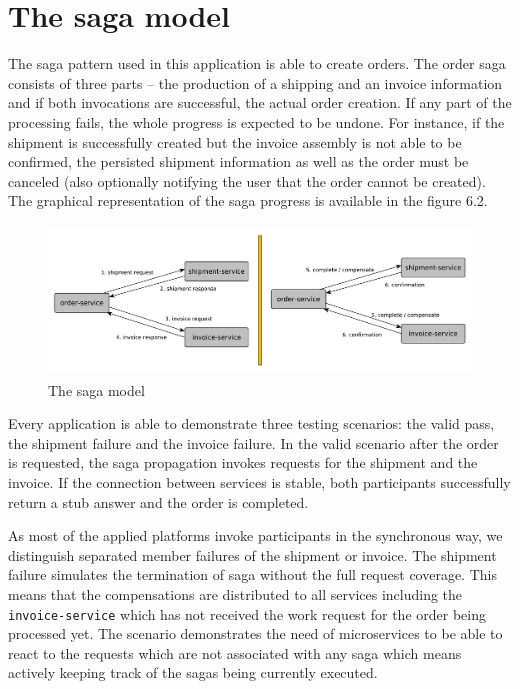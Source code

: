 \documentclass[oneside,
  digital, %
  table,   %
  nolof,     %
  nolot,     %
]{fithesis3}
\begin{document}
\section{The saga model}

The saga pattern used in this application is able to create orders. The order saga consists of three parts -- the production of a shipping and an invoice information and if both invocations are successful, the actual order creation. If any part of the processing fails, the whole progress is expected to be undone. For instance, if the shipment is successfully created but the invoice assembly is not able to be confirmed, the persisted shipment information as well as the order must be canceled (also optionally notifying the user that the order cannot be created). The graphical representation of the saga progress is available in the figure 6.2.

\begin{figure}
    \begin{center}
        \includegraphics[height=40mm]{images/sagaModel.pdf}
    \end{center}
    \caption{The saga model}
\end{figure}

Every application is able to demonstrate three testing scenarios: the valid pass, the shipment failure and the invoice failure. In the valid scenario after the order is requested, the saga propagation invokes requests for the shipment and the invoice. If the connection between services is stable, both participants successfully return a stub answer and the order is completed. 

As most of the applied platforms invoke participants in the synchronous way, we distinguish separated member failures of the shipment or invoice. The shipment failure simulates the termination of saga without the full request coverage. This means that the compensations are distributed to all services including the \texttt{invoice-service} which has not received the work request for the order being processed yet. The scenario demonstrates the need of microservices to be able to react to the requests which are not associated with any saga which means actively keeping track of the sagas being currently executed. 
\end{document}
